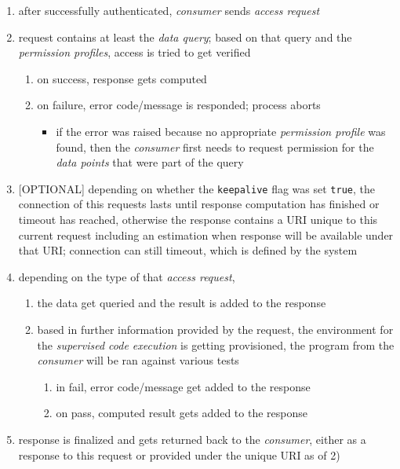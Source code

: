 \documentclass[12pt,english,a4paper,titlepage,cleardoublepage=empty,dottedtoc]{report}
\providecommand{\tightlist}{%
  \setlength{\itemsep}{0pt}\setlength{\parskip}{0pt}}
\begin{document}
\begin{enumerate}
\def\labelenumi{\arabic{enumi}.}
\setcounter{enumi}{-1}
\item
  after successfully authenticated, \emph{consumer} sends \emph{access
  request}
\item
  request contains at least the \emph{data query}; based on that query
  and the \emph{permission profiles}, access is tried to get verified

  \begin{enumerate}
  \def\labelenumii{\alph{enumii})}
  \tightlist
  \item
    on success, response gets computed
  \item
    on failure, error code/message is responded; process aborts

    \begin{itemize}
    \tightlist
    \item
      if the error was raised because no appropriate \emph{permission
      profile} was found, then the \emph{consumer} first needs to
      request permission for the \emph{data points} that were part of
      the query
    \end{itemize}
  \end{enumerate}
\item
  {[}OPTIONAL{]} depending on whether the \texttt{keepalive} flag was
  set \texttt{true}, the connection of this requests lasts until
  response computation has finished or timeout has reached, otherwise
  the response contains a URI unique to this current request including
  an estimation when response will be available under that URI;
  connection can still timeout, which is defined by the system
\item
  depending on the type of that \emph{access request},

  \begin{enumerate}
  \def\labelenumii{(\Alph{enumii})}
  \tightlist
  \item
    the data get queried and the result is added to the response
  \item
    based in further information provided by the request, the
    environment for the \emph{supervised code execution} is getting
    provisioned, the program from the \emph{consumer} will be ran
    against various tests

    \begin{enumerate}
    \def\labelenumiii{\alph{enumiii})}
    \tightlist
    \item
      in fail, error code/message get added to the response
    \item
      on pass, computed result gets added to the response
    \end{enumerate}
  \end{enumerate}
\item
  response is finalized and gets returned back to the \emph{consumer},
  either as a response to this request or provided under the unique URI
  as of 2)
\end{enumerate}
\end{document}
